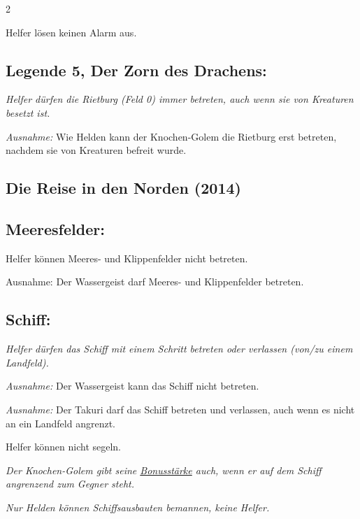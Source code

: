 \documentclass[10pt, a4paper, oneside]{book}
\newcommand{\fan}[1]{\textit{#1}}
\begin{document}
\begin{multicols*}{2}
\begin{bgcolor}
Helfer lösen keinen Alarm aus.
\supercite{NH:Begleitheft}


\subsection{Legende 5, Der Zorn des Drachens:}

\fan{Helfer dürfen die Rietburg (Feld 0) immer betreten, auch wenn sie von Kreaturen besetzt ist.}
\supercite{MH:Begleitheft}

\fan{Ausnahme:} Wie Helden kann der Knochen-Golem die Rietburg erst betreten, nachdem sie von Kreaturen befreit wurde.
\supercite{DH:FAQ}


\end{bgcolor}


\columnbreak


\begin{bgcolor}
\section{Die Reise in den Norden (2014)}

\subsection{Meeresfelder:}

Helfer können Meeres- und Klippenfelder nicht betreten.

Ausnahme: Der Wassergeist darf Meeres- und Klippenfelder betreten.
\supercite{10815,DRidN:Begleitheft,DRidN:FAQ} 


\subsection{Schiff:}

\fan{Helfer dürfen das Schiff mit einem Schritt betreten oder verlassen (von/zu einem Landfeld).}
\supercite{MH:Begleitheft}

\fan{Ausnahme:} Der Wassergeist kann das Schiff nicht betreten.
\supercite{DRidN:Begleitheft}

\fan{Ausnahme:} Der Takuri darf das Schiff betreten und verlassen, auch wenn es nicht an ein Landfeld angrenzt.
\supercite{88939}

Helfer können nicht segeln.
\supercite{32649}

\fan{Der Knochen-Golem gibt seine \hyperref[Bonusstärke]{Bonusstärke} auch, wenn er auf dem Schiff angrenzend zum Gegner steht.}

\fan{Nur Helden können Schiffsausbauten bemannen, keine Helfer.}



\end{bgcolor}
\end{multicols*}
\end{document}
